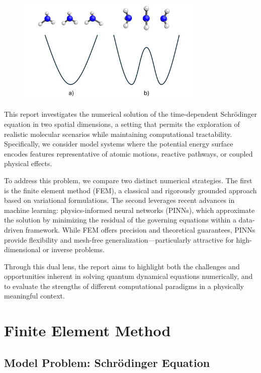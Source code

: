 \documentclass{article}
\theoremstyle{definition}
\theoremstyle{plain}
\theoremstyle{remark}
\begin{document}
\begin{figure}[h]
    \centering
    \includegraphics[width=0.8\textwidth]{figures/Figure2.pdf}
    \caption{}
    \label{fig:fig2}
\end{figure}

This report investigates the numerical solution of the time-dependent Schrödinger equation in two spatial dimensions, a setting that permits the exploration of realistic molecular scenarios while maintaining computational tractability. Specifically, we consider model systems where the potential energy surface encodes features representative of atomic motions, reactive pathways, or coupled physical effects.

To address this problem, we compare two distinct numerical strategies. The first is the finite element method (FEM), a classical and rigorously grounded approach based on variational formulations. The second leverages recent advances in machine learning: physics-informed neural networks (PINNs), which approximate the solution by minimizing the residual of the governing equations within a data-driven framework. While FEM offers precision and theoretical guarantees, PINNs provide flexibility and mesh-free generalization—particularly attractive for high-dimensional or inverse problems.

Through this dual lens, the report aims to highlight both the challenges and opportunities inherent in solving quantum dynamical equations numerically, and to evaluate the strengths of different computational paradigms in a physically meaningful context.

\section{Finite Element Method}

\subsection*{Model Problem: Schrödinger Equation}
\end{document}

